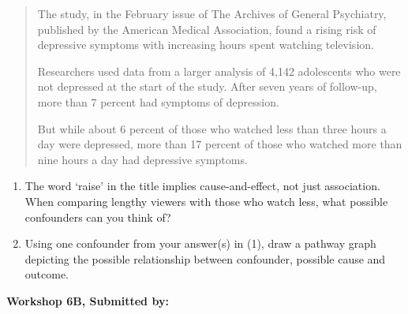 \documentclass[11pt, chapterprefix=true]{scrbook}\usepackage[]{graphicx}\usepackage[]{color}
\begin{document}
\begin{exercises}
\begin{exercise}
\begin{quotation}
The study, in the February issue of The Archives of General Psychiatry, published by the American Medical Association, found a rising risk of depressive symptoms with increasing hours spent watching television.

Researchers used data from a larger analysis of 4,142 adolescents who were not depressed at the start of the study. After seven years of follow-up, more than 7 percent had symptoms of depression.

But while about 6 percent of those who watched less than three hours a day were depressed, more than 17 percent of those who watched more than nine hours a day had depressive symptoms.
\end{quotation}

\begin{enumerate}
  \item The word `raise' in the title implies cause-and-effect, not just association.  When comparing lengthy viewers with those who watch less, what possible    confounders can you think of?
  \item Using one confounder from your answer(s) in (1), draw a pathway graph depicting the possible relationship between confounder, possible cause and outcome.
\end{enumerate}
\end{exercise}
\begin{solution}  %

\end{solution}

\clearpage

    \begin{exercise}  %

    \begin{center}
\begin{flushleft}\textbf{\large \hfill Workshop 6B, Submitted by: }\end{flushleft}

\end{center}
\end{exercise}
\end{exercises}
\end{document}
